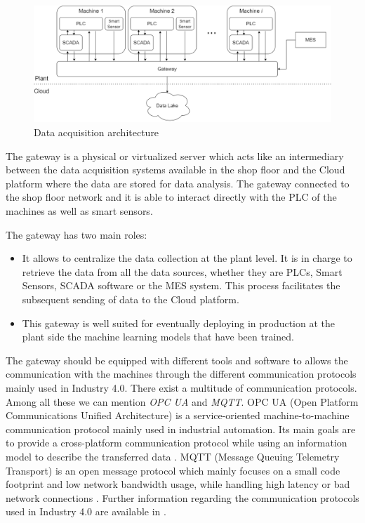 \begin{landscape}
\begin{figure}
\centering
\includegraphics[scale=0.5]{images/chapter_3/Data_acquisition_architecture.png}
\caption{Data acquisition architecture}
\label{fig:data_acquisition_architecture}
\end{figure}
\end{landscape}

The gateway is a physical or virtualized server which acts like an intermediary between the data acquisition systems available in the shop floor and the Cloud platform where the data are stored for data analysis. The gateway connected to the shop floor network and it is able to interact directly with the PLC of the machines as well as smart sensors.  

The gateway has two main roles:

\begin{itemize}
    \item It allows to centralize the data collection at the plant level. It is in charge to retrieve the data from all the data sources, whether they are PLCs, Smart Sensors, SCADA software or the MES system. This process facilitates the subsequent sending of data to the Cloud platform. 
    \item This gateway is well suited for eventually deploying in production at the plant side the machine learning models that have been trained. 
\end{itemize}

The gateway should be equipped with different tools and software to allows the communication with the machines through the different communication protocols mainly used in Industry 4.0. There exist a multitude of communication protocols. Among all these we can mention \textit{OPC UA} and \textit{MQTT}. OPC UA (Open Platform Communications Unified Architecture) is a service-oriented machine-to-machine communication protocol mainly used in industrial automation. Its main goals are to provide a cross-platform communication protocol while using an information model to describe the transferred data \citep{profanter2019opc}. MQTT (Message Queuing Telemetry Transport) is an open message protocol which mainly focuses on a small code footprint and low network bandwidth usage, while handling high latency or bad network connections \citep{profanter2019opc}. Further information regarding the communication protocols used in Industry 4.0 are available in \citep{profanter2019opc}\citep{8262021}\citep{zezulka2018communication}.



